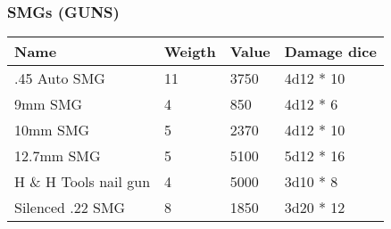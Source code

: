 
\subsubsection{SMGs (GUNS)}
\begin{longtable}{|p{4cm}|p{1.5cm}|p{1.5cm}|p{9cm}|}
\hline
\bfseries Name & \bfseries Weigth & \bfseries Value & \bfseries Damage dice \\
\hline
\endhead
.45 Auto SMG & 11 & 3750 & 4d12 * 10 \\
9mm SMG & 4 & 850 & 4d12 * 6 \\
10mm SMG & 5 & 2370 & 4d12 * 10 \\
12.7mm SMG & 5 & 5100 & 5d12 * 16 \\
H \& H Tools nail gun & 4 & 5000 & 3d10 * 8 \\
Silenced .22 SMG & 8 & 1850 & 3d20 * 12 \\
\hline
\end{longtable}
